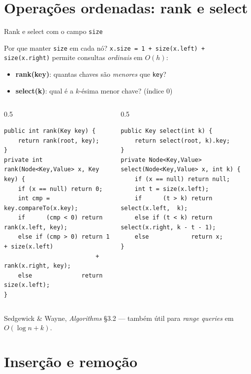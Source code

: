 \documentclass[aspectratio=169]{beamer}
\begin{document}
\section{Operações ordenadas: rank e select}

\begin{frame}[fragile,shrink=10]{Rank e select com o campo \texttt{size}}
\begin{block}{Por que manter \texttt{size} em cada nó?}
\texttt{x.size = 1 + size(x.left) + size(x.right)} permite consultas \emph{ordinais} em $O(h)$:
\begin{itemize}\small
  \item \textbf{rank(key)}: quantas chaves são \emph{menores} que \texttt{key}?
  \item \textbf{select(k)}: qual é a $k$-ésima menor chave? (índice 0)
\end{itemize}
\end{block}
\begin{columns}[T]
\begin{column}{0.5\textwidth}
\begin{lstlisting}
public int rank(Key key) {
    return rank(root, key);
}
private int rank(Node<Key,Value> x, Key key) {
    if (x == null) return 0;
    int cmp = key.compareTo(x.key);
    if      (cmp < 0) return rank(x.left, key);
    else if (cmp > 0) return 1 + size(x.left)
                          + rank(x.right, key);
    else              return size(x.left);
}
\end{lstlisting}
\end{column}
\begin{column}{0.5\textwidth}
\begin{lstlisting}
public Key select(int k) {
    return select(root, k).key;
}
private Node<Key,Value> select(Node<Key,Value> x, int k) {
    if (x == null) return null;
    int t = size(x.left);
    if      (t > k) return select(x.left,  k);
    else if (t < k) return select(x.right, k - t - 1);
    else            return x;
}
\end{lstlisting}
\end{column}
\end{columns}
\hfill\tiny{Sedgewick \& Wayne, \emph{Algorithms} §3.2 --- também útil para \emph{range queries} em $O(\log n + k)$.}
\end{frame}

\section{Inserção e remoção}
\end{document}
